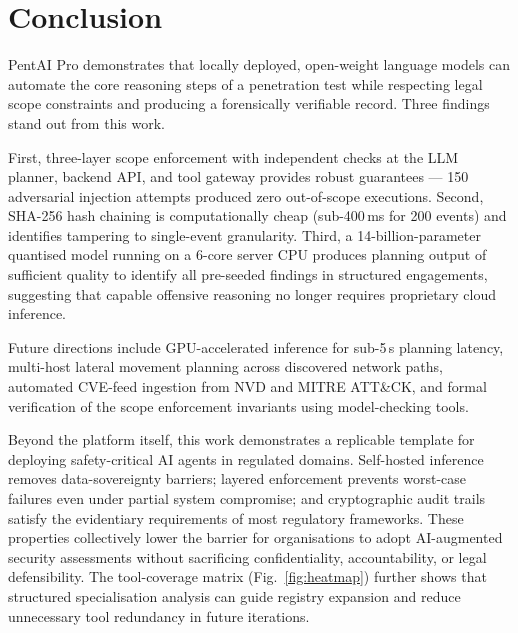 \documentclass[conference]{IEEEtran}
\begin{document}
\section{Conclusion}

PentAI Pro demonstrates that locally deployed, open-weight language models
can automate the core reasoning steps of a penetration test while
respecting legal scope constraints and producing a forensically
verifiable record. Three findings stand out from this work.

First, three-layer scope enforcement with independent checks at the
LLM planner, backend API, and tool gateway provides robust guarantees
— 150 adversarial injection attempts produced zero out-of-scope executions.
Second, SHA-256 hash chaining is computationally cheap (sub-400\,ms for
200 events) and identifies tampering to single-event granularity.
Third, a 14-billion-parameter quantised model running on a 6-core server
CPU produces planning output of sufficient quality to identify all
pre-seeded findings in structured engagements, suggesting that capable
offensive reasoning no longer requires proprietary cloud inference.

Future directions include GPU-accelerated inference for sub-5\,s
planning latency, multi-host lateral movement planning across discovered
network paths, automated CVE-feed ingestion from NVD and MITRE ATT\&CK,
and formal verification of the scope enforcement invariants using
model-checking tools.

Beyond the platform itself, this work demonstrates a replicable template
for deploying safety-critical AI agents in regulated domains.
Self-hosted inference removes data-sovereignty barriers; layered
enforcement prevents worst-case failures even under partial system
compromise; and cryptographic audit trails satisfy the evidentiary
requirements of most regulatory frameworks.
These properties collectively lower the barrier for organisations
to adopt AI-augmented security assessments without sacrificing
confidentiality, accountability, or legal defensibility.
The tool-coverage matrix (Fig.~\ref{fig:heatmap}) further shows that
structured specialisation analysis can guide registry expansion and
reduce unnecessary tool redundancy in future iterations.
\end{document}
